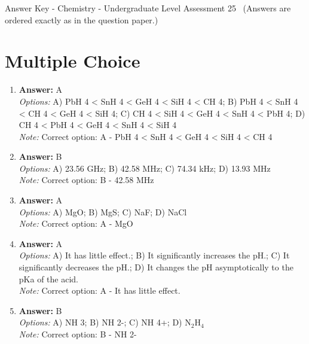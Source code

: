 \documentclass[12pt]{article}
\begin{document}
\begin{center}
Answer Key - Chemistry - Undergraduate Level Assessment 25 \
\small (Answers are ordered exactly as in the question paper.)
\end{center}

\section*{Multiple Choice}
\begin{enumerate}[label=\arabic*.]
\item \textbf{Answer:} A
\\ \textit{Options:} A) PbH 4 \textless{} SnH 4 \textless{} GeH 4 \textless{} SiH 4 \textless{} CH 4; B) PbH 4 \textless{} SnH 4 \textless{} CH 4 \textless{} GeH 4 \textless{} SiH 4; C) CH 4 \textless{} SiH 4 \textless{} GeH 4 \textless{} SnH 4 \textless{} PbH 4; D) CH 4 \textless{} PbH 4 \textless{} GeH 4 \textless{} SnH 4 \textless{} SiH 4
\\ \textit{Note:} Correct option: A - PbH 4 \textless{} SnH 4 \textless{} GeH 4 \textless{} SiH 4 \textless{} CH 4
\item \textbf{Answer:} B
\\ \textit{Options:} A) 23.56 GHz; B) 42.58 MHz; C) 74.34 kHz; D) 13.93 MHz
\\ \textit{Note:} Correct option: B - 42.58 MHz
\item \textbf{Answer:} A
\\ \textit{Options:} A) MgO; B) MgS; C) NaF; D) NaCl
\\ \textit{Note:} Correct option: A - MgO
\item \textbf{Answer:} A
\\ \textit{Options:} A) It has little effect.; B) It significantly increases the pH.; C) It significantly decreases the pH.; D) It changes the pH asymptotically to the pKa of the acid.
\\ \textit{Note:} Correct option: A - It has little effect.
\item \textbf{Answer:} B
\\ \textit{Options:} A) NH 3; B) NH 2-; C) NH 4+; D) N$_{2}$H$_{4}$
\\ \textit{Note:} Correct option: B - NH 2-
\end{enumerate}
\end{document}
